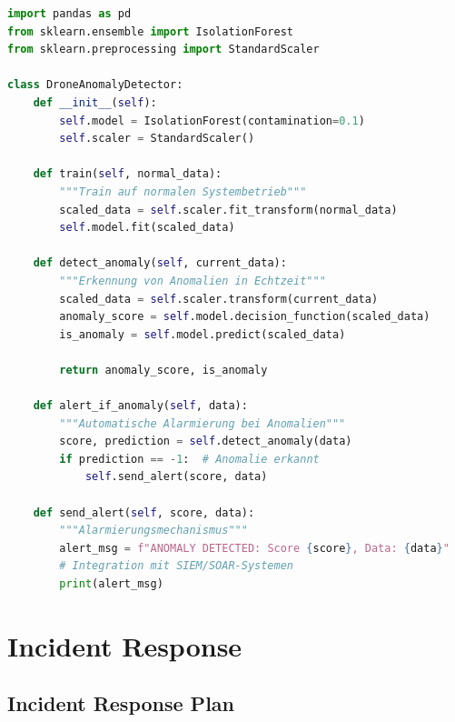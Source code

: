 \documentclass[11pt,a4paper]{article}
\begin{document}
\begin{lstlisting}[language=python, caption=Machine Learning für Anomalie-Erkennung]
import pandas as pd
from sklearn.ensemble import IsolationForest
from sklearn.preprocessing import StandardScaler

class DroneAnomalyDetector:
    def __init__(self):
        self.model = IsolationForest(contamination=0.1)
        self.scaler = StandardScaler()
        
    def train(self, normal_data):
        """Train auf normalen Systembetrieb"""
        scaled_data = self.scaler.fit_transform(normal_data)
        self.model.fit(scaled_data)
        
    def detect_anomaly(self, current_data):
        """Erkennung von Anomalien in Echtzeit"""
        scaled_data = self.scaler.transform(current_data)
        anomaly_score = self.model.decision_function(scaled_data)
        is_anomaly = self.model.predict(scaled_data)
        
        return anomaly_score, is_anomaly
        
    def alert_if_anomaly(self, data):
        """Automatische Alarmierung bei Anomalien"""
        score, prediction = self.detect_anomaly(data)
        if prediction == -1:  # Anomalie erkannt
            self.send_alert(score, data)
            
    def send_alert(self, score, data):
        """Alarmierungsmechanismus"""
        alert_msg = f"ANOMALY DETECTED: Score {score}, Data: {data}"
        # Integration mit SIEM/SOAR-Systemen
        print(alert_msg)
\end{lstlisting}

\section{Incident Response}

\subsection{Incident Response Plan}
\end{document}
